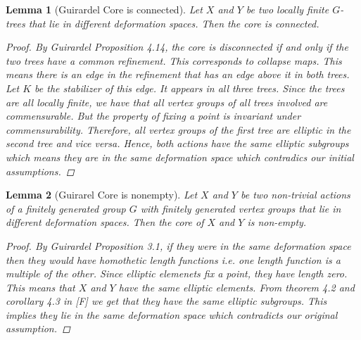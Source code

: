 \documentclass{article}
\theoremstyle{mystyle}
\newtheorem{lem}{Lemma}[section]
\theoremstyle{remark}
\begin{document}
\begin{lem}
    [Guirardel Core is connected]
    \label{lem:coreconnected} 
    Let \(X\) and \(Y\) be two locally finite \(G\)-trees that lie in different deformation spaces. Then the core is connected.
    \begin{proof}
        By Guirardel Proposition 4.14, the core is disconnected if and only if the two trees have a common refinement. This corresponds to collapse maps. This means there is an edge in the refinement that has an edge above it in both trees. Let \(K\) be the stabilizer of this edge. It appears in all three trees. Since the trees are all locally finite, we have that all vertex groups of all trees involved are commensurable. But the property of fixing a point is invariant under commensurability. Therefore, all vertex groups of the first tree are elliptic in the second tree and vice versa. Hence, both actions have the same elliptic subgroups which means they are in the same deformation space which contradics our initial assumptions.
    \end{proof}
\end{lem}

\begin{lem}
    [Guirarel Core is nonempty]
    \label{lem:corenonempty} 
    Let \(X\) and \(Y\) be two non-trivial actions of a finitely generated group \(G\) with finitely generated vertex groups that lie in different deformation spaces. Then the core of \(X\) and \(Y\) is non-empty.
    \begin{proof}
        By Guirardel Proposition 3.1, if they were in the same deformation space then they would have homothetic length functions i.e. one length function is a multiple of the other. Since elliptic elemenets fix a point, they have length zero. This means that \(X\) and \(Y\) have the same elliptic elements. From theorem 4.2 and corollary 4.3 in [F] we get that they have the same elliptic subgroups. This implies they lie in the same deformation space which contradicts our original assumption.
    \end{proof}
\end{lem}
\end{document}
